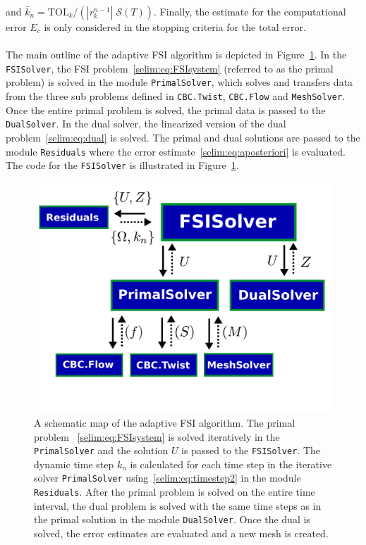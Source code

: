 and $\bar{k}_n = \mathrm{TOL}_k/(| r_k^{n-1} | \;\mathcal{S}(T))$. Finally,
the estimate for the computational error $E_c$ is only considered in
the stopping criteria for the total error. 
\\\\
The main outline of the adaptive FSI algorithm is depicted in
Figure~\ref{selim:fig:adaptiveMAP}. In the \texttt{FSISolver}, the FSI
problem~\eqref{selim:eq:FSIsystem} (referred to as the primal problem)
is solved in the module \texttt{PrimalSolver}, which solves and
transfers data from the three sub problems defined in
\texttt{CBC.Twist}, \texttt{CBC.Flow} and \texttt{MeshSolver}. Once
the entire primal problem is solved, the primal data is passed to the
\texttt{DualSolver}. In the dual solver, the linearized version of the
dual problem~\eqref{selim:eq:dual} is solved. The primal and dual
solutions are passed to the module \texttt{Residuals} where the error
estimate~\eqref{selim:eq:aposteriori} is evaluated. The code for the
\texttt{FSISolver} is illustrated in Figure~\ref{selim:fig:adaptiveMAP}.
\begin{figure}
\label{selim:fig:adaptiveMAP}
\includegraphics[width=1.0\textwidth]{chapters/selim/pdf/adaptive.pdf}
\caption{A schematic map of the adaptive FSI algorithm. The primal
  problem ~\eqref{selim:eq:FSIsystem} is solved iteratively in the
  \texttt{PrimalSolver} and the solution $U$ is passed to the
  \texttt{FSISolver}. The dynamic time step $k_n$ is calculated for
  each time step in the iterative solver \texttt{PrimalSolver}
  using~\eqref{selim:eq:timestep2} in the module
  \texttt{Residuals}. After the primal problem is solved on the entire
  time interval, the dual problem is solved with the same time steps
  as in the primal solution in the module \texttt{DualSolver}. Once
  the dual is solved, the error estimates are evaluated and a new
  mesh is created.}
\end{figure}

